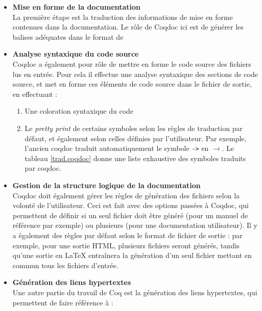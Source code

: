 \documentclass[a4paper, 11pt]{report}
\begin{document}
    \begin{itemize}
      \item \textbf{Mise en forme de la documentation} \\
        La première étape est la traduction des informations de mise en forme
        contenues dans la documentation. Le rôle de Coqdoc ici est de générer
        les balises adéquates dans le format de
      \item \textbf{Analyse syntaxique du code source} \\
        Coqdoc a également pour rôle de mettre en forme le code source des
        fichiers lus en entrée. Pour cela il effectue une analyse syntaxique
        des sections de code source, et met en forme ces éléments de code
        source dans le fichier de sortie, en effectuant :
        \begin{enumerate}
          \item Une coloration syntaxique du code
          \item Le \textit{pretty print} de certains symboles selon les règles
            de traduction par défaut, et également selon celles définies
            par l'utilisateur. Par exemple, l'ancien coqdoc traduit
            automatiquement le symbole \texttt{->} en \texttt{$\rightarrow$}.
            Le tableau \cref{trad.coqdoc} donne une liste exhaustive des
            symboles traduits par coqdoc.
        \end{enumerate}
      \item \textbf{Gestion de la structure logique de la documentation} \\
        Coqdoc doit également gérer les règles de génération des fichiers selon
        la volonté de l'utilisateur. Ceci est fait avec des options passées à
        Coqdoc, qui permettent de définir si un seul fichier doit être généré
        (pour un manuel de référence par exemple) ou plusieurs
        (pour une documentation utilisateur). Il y a également des règles par
        défaut selon le format de fichier de sortie : par exemple, pour une
        sortie HTML, plusieurs fichiers seront générés, tandis qu'une sortie
        en LaTeX entraînera la génération d'un seul fichier mettant en commun
        tous les fichiers d'entrée.
      \item \textbf{Génération des liens hypertextes} \\
        Une autre partie du travail de Coq est la génération des liens
        hypertextes, qui permettent de faire référence à :
        \begin{enumerate}

\end{enumerate}
\end{itemize}
\end{document}
